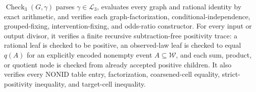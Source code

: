 \(\operatorname{Check}_3(G,\gamma)\) parses \(\gamma\in\mathcal L_3\), evaluates every graph and rational identity by exact arithmetic, and verifies each graph-factorization, conditional-independence, grouped-fixing, intervention-fixing, and odds-ratio constructor. For every input or output divisor, it verifies a finite recursive subtraction-free positivity trace: a rational leaf is checked to be positive, an observed-law leaf is checked to equal \(q(A)\) for an explicitly encoded nonempty event \(A\subseteq\mathcal W\), and each sum, product, or quotient node is checked from already accepted positive children. It also verifies every \(\mathrm{NONID}\) table entry, factorization, coarsened-cell equality, strict-positivity inequality, and target-cell inequality.